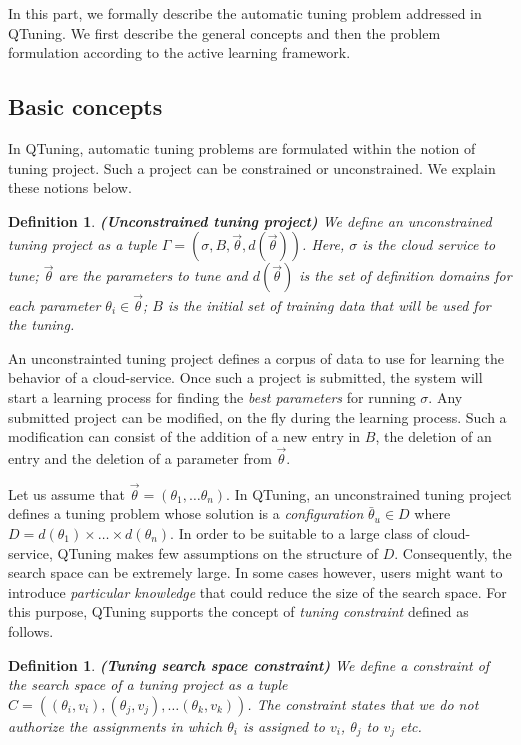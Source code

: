 \documentclass[10pt, conference, compsocconf]{IEEEtran}
\newtheorem{definition}[theorem]{Definition}
\begin{document}
In this part, we formally describe the automatic tuning problem addressed in QTuning. We first describe 
the general concepts and then the problem formulation according to the active learning framework.
 \subsection{Basic concepts}

In QTuning, automatic tuning problems are formulated within the notion of tuning project.  Such  
a project can be  constrained or unconstrained. We explain these notions below.

\begin{definition}{\bf (Unconstrained tuning project)}
We define an unconstrained tuning project as a tuple $ \Gamma = (\sigma, B, \vec{\theta}, d(\vec{\theta}))$. Here, $\sigma$ is the cloud service to tune; 
$\vec{\theta}$ are the parameters to tune and $d(\vec{\theta})$ is the set of definition domains for each parameter 
$\theta_i \in \vec{\theta}$; $B$ is the initial set of training data that will be used for the tuning.
\end{definition}

An unconstrainted tuning project defines a corpus of data to use for learning the behavior of a cloud-service. 
Once such a project is submitted, the system will start a learning process for finding the {\it best parameters} for 
running $\sigma$. Any submitted project can be modified, on the fly during the learning process. Such a modification can consist of  
the addition of a new entry in $B$, the deletion of an entry and the deletion of a parameter from $\vec{\theta}$. 

Let us assume that $\vec{\theta} = (\theta_1,\dots \theta_n)$. In QTuning, an unconstrained tuning project defines 
a tuning problem whose solution is a {\it configuration} $\bar{\theta}_u \in D$ where $D = d(\theta_1) \times \dots  \times d(\theta_n)$. 
In order to be suitable to a large class of cloud-service, QTuning makes few assumptions on the structure of $D$. 
Consequently, the search space can be extremely large. 
In some cases however, users might want to introduce {\it particular knowledge} that could reduce the size of the search space. 
For this purpose, QTuning supports the concept of {\it tuning constraint} defined as follows.

\begin{definition}{\bf (Tuning search space constraint)}
We define a constraint of the search space of a tuning project as a tuple $C = ((\theta_i, v_i), (\theta_j, v_j),\dots (\theta_k, v_k))$. 
The constraint states that we do not authorize the assignments in which $\theta_i$ is assigned to $v_i$, $\theta_j$ to $v_j$ etc.
\end{definition}
\end{document}
